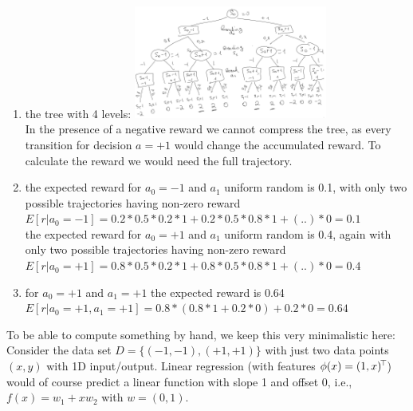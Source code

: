 \begin{solution}
\begin{enumerate}
\item the tree with 4 levels:
  \includegraphics[width=0.5\textwidth]{../pics/ex32a.png}
\\
In the presence of a negative reward we cannot compress the tree, as every transition for decision $a=+1$ would change the accumulated reward. To calculate the reward we would need the full trajectory.


\item the expected reward for $a_0 = -1$ and $a_1$ uniform random is 0.1, with only two possible trajectories having non-zero reward \\
$E[r | a_0 = -1] = 0.2 * 0.5 * 0.2 * 1 + 0.2 * 0.5 * 0.8 * 1 + (..) * 0 = 0.1$\\
the expected reward for $a_0 = +1$ and $a_1$ uniform random is 0.4, again with only two possible trajectories having non-zero reward \\
$E[r | a_0 = +1] = 0.8 * 0.5 * 0.2 * 1 + 0.8 * 0.5 * 0.8 * 1 + (..) * 0  = 0.4$\\
\item for $a_0 = +1$ and $a_1 = +1$ the expected reward is 0.64 \\
$E[r | a_0 = +1, a_1 = +1] = 0.8 * (0.8 * 1 + 0.2 * 0) + 0.2 * 0 = 0.64$
\end{enumerate}


\end{solution}



To be able to compute something by hand, we keep this very minimalistic here: Consider the data set $D=\{(-1,-1), (+1,+1)\}$ with just two data points $(x,y)$ with 1D input/output. Linear regression (with features $\phi(x) = (1,x)^{\!\top\!}$) would of course predict a linear function with slope 1 and offset 0, i.e., $f(x) = w_1 + x w_2$ with $w=(0,1)$.

